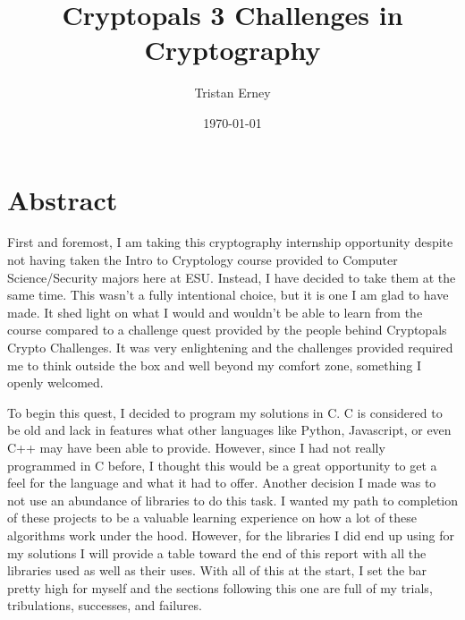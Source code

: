 \documentclass{report}
\title{\textbf{Cryptopals 3	Challenges in Cryptography}}
\author{Tristan Erney}
\date{\today}
\begin{document}
	
	\maketitle
	\tableofcontents
	\pagebreak
	
	\section*{Abstract}
		First and foremost, I am taking this cryptography internship opportunity despite not having taken the Intro to Cryptology course provided to Computer Science/Security majors here at ESU. Instead, I have decided to take them at the same time. This wasn't a fully intentional choice, but it is one I am glad to have made. It shed light on what I would and wouldn't be able to learn from the course compared to a challenge quest provided by the people behind Cryptopals Crypto Challenges. It was very enlightening and the challenges provided required me to think outside the box and well beyond my comfort zone, something I openly welcomed. 
		\par
		To begin this quest, I decided to program my solutions in C. C is considered to be old and lack in features what other languages like Python, Javascript, or even C++ may have been able to provide. However, since I had not really programmed in C before, I thought this would be a great opportunity to get a feel for the language and what it had to offer. Another decision I made was to not use an abundance of libraries to do this task. I wanted my path to completion of these projects to be a valuable learning experience on how a lot of these algorithms work under the hood. However, for the libraries I did end up using for my solutions I will provide a table toward the end of this report with all the libraries used as well as their uses. With all of this at the start, I set the bar pretty high for myself and the sections following this one are full of my trials, tribulations, successes, and failures. 
	
\end{document}
